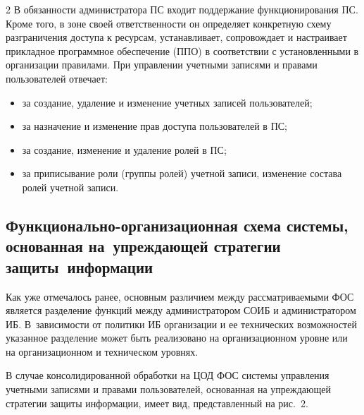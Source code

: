 \begin{multicols}{2}
       В обязанности администратора ПС входит поддержание функционирования ПС. 
Кроме того, в зоне своей ответственности он определяет конкретную схему разграничения 
доступа к ресурсам, устанавливает, сопровождает и настраивает прикладное программное 
обеспечение (ППО) в соответствии с уста\-нов\-лен\-ны\-ми в организации правилами. При 
управлении учетными записями и правами пользователей отвечает: 
       \begin{itemize}
\item за создание, удаление и изменение учетных записей пользователей; 
\item за назначение и изменение прав доступа пользователей в ПС; 
\item за создание, изменение и удаление ролей в ПС; 
\item за приписывание роли (группы ролей) учетной записи, изменение состава ролей 
учетной за\-писи.
\end{itemize}

\subsection{Функционально-организационная схема системы, основанная на~упреждающей стратегии 
защиты~информации}
       
       Как уже отмечалось ранее, основным различием между рассматриваемыми ФОС 
является разделение функций между администратором СОИБ и администратором ИБ. 
В~зависимости от политики ИБ организации и ее технических возможностей указанное 
разделение может быть реализовано на организационном уровне или на организационном 
и техническом уровнях.
       
       В случае консолидированной обработки на ЦОД ФОС сис\-те\-мы управ\-ле\-ния 
учетными записями и правами пользователей, основанная на упреждающей стратегии 
защиты информации, имеет вид, представленный на рис.~2.

\begin{figure} %
\vspace*{1pt}
 \begin{center}
 \mbox{%
 \epsfxsize=159.191mm
 }
 \end{center}
 \vspace*{-9pt}
\end{figure}
       

\end{multicols}
